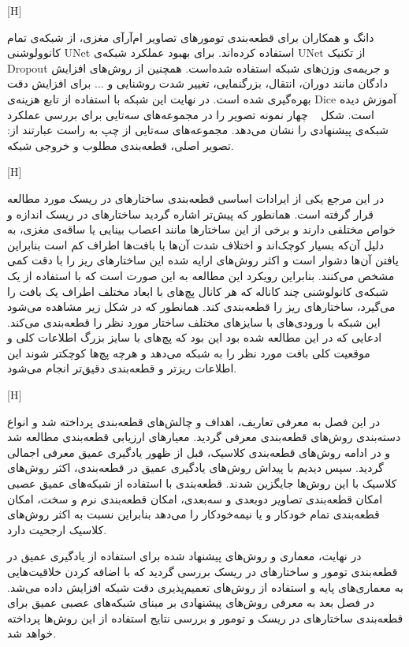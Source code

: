 [H]

دانگ و همکاران  برای قطعه‌بندی تومورهای تصاویر ام‌آرآی مغزی، از شبکه‌ی تمام کانوولوشنی UNet استفاده کرده‌اند. برای بهبود عملکرد شبکه‌ی UNet از تکنیک Dropout و جریمه‌ی وزن‌های شبکه استفاده شده‌است. همچنین از روش‌های افزایش دادگان مانند دوران، انتقال، بزرگنمایی، تغییر شدت روشنایی و ... برای افزایش دقت بهر‌ه‌گیری شده است. در نهایت این شبکه با استفاده از تابع هزینه‌ی Dice آموزش دیده است. شکل ~ چهار نمونه تصویر را در مجموعه‌های سه‌تایی برای بررسی عملکرد شبکه‌ی پیشنهادی را نشان می‌دهد. مجموعه‌های سه‌تایی از چپ به راست عبارتند از: تصویر اصلی، قطعه‌بندی مطلوب و خروجی شبکه.

[H]

در این مرجع  یکی از ایرادات اساسی قطعه‌بندی ساختارهای در ریسک مورد مطالعه قرار گرفته است. همانطور که پیش‌تر اشاره گردید ساختارهای در ریسک اندازه و خواص مختلفی دارند و برخی از این ساختارها مانند اعصاب بینایی یا ساقه‌ی مغزی، به دلیل آن‌که بسیار کوچک‌اند و اختلاف شدت آن‌ها با بافت‌ها اطراف کم است بنابراین یافتن آن‌ها دشوار است و اکثر روش‌های ارایه شده این ساختارهای ریز را با دقت کمی مشخص می‌کنند. بنابراین رویکرد این مطالعه به این صورت است که با استفاده از یک شبکه‌ی کانولوشنی چند کاناله که هر کانال پچ‌های با ابعاد مختلف اطراف یک بافت را می‌گیرد، ساختارهای ریز را قطعه‌بندی کند. همانطور که در شکل زیر مشاهده می‌شود این شبکه با ورودی‌های با سایزهای مختلف ساختار مورد نظر را قطعه‌بندی می‌کند. ادعایی که در این مطالعه شده بود این بود که پچ‌های با سایز بزرگ اطلاعات کلی و موقعیت کلی بافت مورد نظر را به شبکه می‌دهد و هرچه پچ‌ها کوچکتر شوند این اطلاعات ریزتر و قطعه‌بندی دقیق‌تر انجام می‌شود.

[H]

در این فصل به معرفی تعاریف، اهداف و چالش‌های قطعه‌بندی پرداخته شد و انواع دسته‌بندی روش‌های قطعه‌بندی معرفی گردید. معیارهای ارزیابی قطعه‌بندی مطالعه شد و در ادامه روش‌های قطعه‌بندی کلاسیک، قبل از ظهور یادگیری عمیق معرفی اجمالی گردید. سپس دیدیم با پیداش روش‌های یادگیری عمیق در قطعه‌بندی، اکثر روش‌های کلاسیک با این روش‌ها جایگزین شدند. قطعه‌بندی با استفاده از شبکه‌های عمیق عصبی امکان قطعه‌بندی تصاویر دو‌بعدی و سه‌بعدی، امکان قطعه‌بندی نرم و سخت، امکان ‌قطعه‌بندی تمام خودکار و یا نیمه‌خودکار را می‌دهد بنابراین نسبت به اکثر روش‌های کلاسیک ارجحیت دارد.

در نهایت، معماری و روش‌های پیشنهاد شده برای استفاده از یادگیری عمیق در قطعه‌بندی تومور و ساختارهای در ریسک بررسی گردید که با اضافه کردن خلاقیت‌هایی به معماری‌های پایه و استفاده از روش‌های تعمیم‌پذیری دقت شبکه افزایش داده می‌شد. در فصل بعد به معرفی روش‌های پیشنهادی بر مبنای شبکه‌های عصبی عمیق برای قطعه‌بندی ساختارهای در ریسک و تومور و بررسی نتایج استفاده از این روش‌ها پرداخته خواهد شد.

